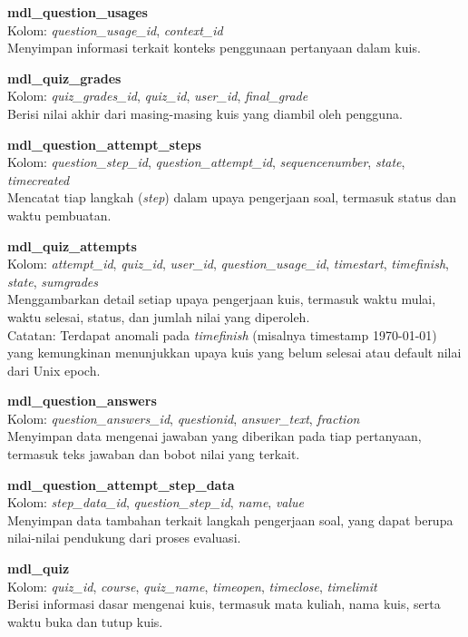 \textbf{mdl\_question\_usages} \\
Kolom: \textit{question\_usage\_id}, \textit{context\_id} \\
Menyimpan informasi terkait konteks penggunaan pertanyaan dalam kuis.

\textbf{mdl\_quiz\_grades} \\
Kolom: \textit{quiz\_grades\_id}, \textit{quiz\_id}, \textit{user\_id}, \textit{final\_grade} \\
Berisi nilai akhir dari masing-masing kuis yang diambil oleh pengguna.

\textbf{mdl\_question\_attempt\_steps} \\
Kolom: \textit{question\_step\_id}, \textit{question\_attempt\_id}, \textit{sequencenumber}, \textit{state}, \textit{timecreated} \\
Mencatat tiap langkah (\textit{step}) dalam upaya pengerjaan soal, termasuk status dan waktu pembuatan.

\textbf{mdl\_quiz\_attempts} \\
Kolom: \textit{attempt\_id}, \textit{quiz\_id}, \textit{user\_id}, \textit{question\_usage\_id}, \textit{timestart}, \textit{timefinish}, \textit{state}, \textit{sumgrades} \\
Menggambarkan detail setiap upaya pengerjaan kuis, termasuk waktu mulai, waktu selesai, status, dan jumlah nilai yang diperoleh. \\
Catatan: Terdapat anomali pada \textit{timefinish} (misalnya timestamp 1970-01-01) yang kemungkinan menunjukkan upaya kuis yang belum selesai atau default nilai dari Unix epoch.

\textbf{mdl\_question\_answers} \\
Kolom: \textit{question\_answers\_id}, \textit{questionid}, \textit{answer\_text}, \textit{fraction} \\
Menyimpan data mengenai jawaban yang diberikan pada tiap pertanyaan, termasuk teks jawaban dan bobot nilai yang terkait.

\textbf{mdl\_question\_attempt\_step\_data} \\
Kolom: \textit{step\_data\_id}, \textit{question\_step\_id}, \textit{name}, \textit{value} \\
Menyimpan data tambahan terkait langkah pengerjaan soal, yang dapat berupa nilai-nilai pendukung dari proses evaluasi.

\textbf{mdl\_quiz} \\
Kolom: \textit{quiz\_id}, \textit{course}, \textit{quiz\_name}, \textit{timeopen}, \textit{timeclose}, \textit{timelimit} \\
Berisi informasi dasar mengenai kuis, termasuk mata kuliah, nama kuis, serta waktu buka dan tutup kuis.

